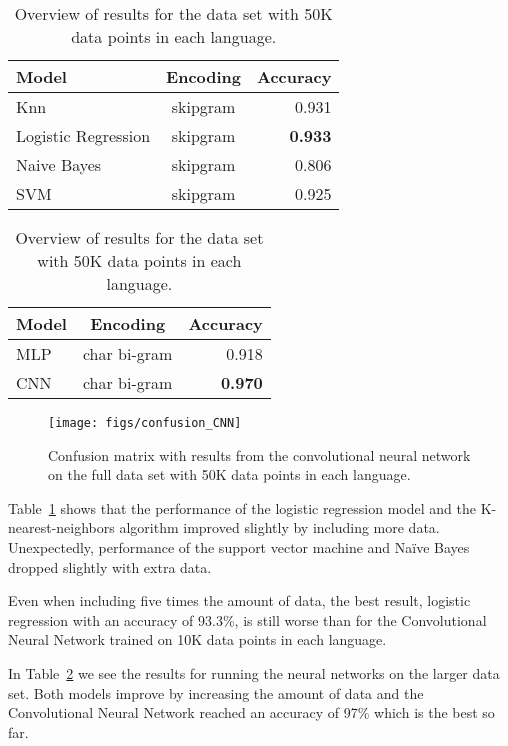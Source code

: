 \documentclass[11pt,a4paper]{article}
\begin{document}
\begin{table}
  \centering
  \begin{tabular}{ l  c | r }
    \hline
    Model               & Encoding & Accuracy \\
    \hline
    Knn                 & skipgram & 0.931\\
    Logistic Regression & skipgram  & \textbf{0.933}\\
    Naive Bayes         & skipgram  & 0.806\\
    SVM                 & skipgram& 0.925\\
    \hline
  \end{tabular}
  \caption{Overview of results for the data set with 50K data points in each language.}
  \label{results-sklearn300k}
\end{table}


\begin{table}
  \centering
  \begin{tabular}{ l c | r }
    \hline
    Model               & Encoding & Accuracy \\
    \hline
    MLP                 & char bi-gram  & 0.918\\
    CNN                 & char bi-gram  & \textbf{0.970}\\
    \hline
  \end{tabular}
  \caption{Overview of results for the data set with 50K data points in each language.}
  \label{results-keras-300k}
\end{table}


\begin{figure}
  \centering
  \texttt{[image: figs/confusion\_CNN]}
  \caption{Confusion matrix with results from the convolutional neural network on the full data set with 50K data points in each language.}
  \label{confusion_matrix-big-cnn}
\end{figure}


Table~\ref{results-sklearn300k} shows that the performance of the logistic regression model and the K-nearest-neighbors algorithm improved slightly by including more data. Unexpectedly, performance of the support vector machine and Na\"{i}ve Bayes dropped slightly with extra data.

Even when including five times the amount of data, the best result, logistic regression with an accuracy of 93.3\%, is still worse than for the Convolutional Neural Network trained on 10K data points in each language.

In Table~\ref{results-keras-300k} we see the results for running the neural networks on the larger data set. Both models improve by increasing the amount of data and the Convolutional Neural Network reached an accuracy of 97\% which is the best so far.
\end{document}
